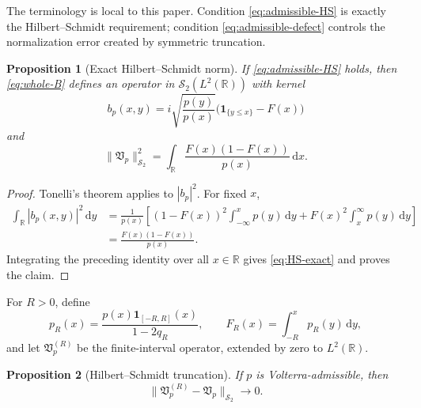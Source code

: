 \documentclass[11pt,reqno]{amsart}
\numberwithin{equation}{section}
\newtheorem{proposition}[proposition]{Proposition}
\newcommand{\R}{\mathbb R}
\newcommand{\1}{\mathbf 1}
\newcommand{\HS}{\mathcal S_2}
\newcommand{\Vp}{\mathfrak V_p}
\newcommand{\dd}{\,\mathrm d}
\begin{document}
The terminology is local to this paper.  Condition \eqref{eq:admissible-HS}
is exactly the Hilbert--Schmidt requirement; condition
\eqref{eq:admissible-defect} controls the normalization error created by
symmetric truncation.

\begin{proposition}[Exact Hilbert--Schmidt norm]\label{prop:HS-identity}
If \eqref{eq:admissible-HS} holds, then \eqref{eq:whole-B} defines an operator
in $\HS(L^2(\R))$ with kernel
\begin{equation}\label{eq:whole-kernel}
 b_p(x,y)=i\sqrt{\frac{p(y)}{p(x)}}
 \bigl(\1_{\{y\leq x\}}-F(x)\bigr)
\end{equation}
and
\begin{equation}\label{eq:HS-exact}
 \boxed{\|\Vp\|_{\HS}^2
 =\int_{\R}\frac{F(x)(1-F(x))}{p(x)}\dd x.}
\end{equation}
\end{proposition}

\begin{proof}
Tonelli's theorem applies to $|b_p|^2$.  For fixed $x$,
\begin{align*}
 \int_{\R}|b_p(x,y)|^2\dd y
 &=\frac{1}{p(x)}\left[(1-F(x))^2
 \int_{-\infty}^xp(y)\dd y
 +F(x)^2\int_x^\infty p(y)\dd y\right]\\
 &=\frac{F(x)(1-F(x))}{p(x)}.
\end{align*}
Integrating the preceding identity over all $x\in\R$ gives
\eqref{eq:HS-exact} and proves the claim.
\end{proof}

For $R>0$, define
\begin{equation}\label{eq:pR-def}
 p_R(x)=\frac{p(x)\1_{[-R,R]}(x)}{1-2q_R},
 \qquad
 F_R(x)=\int_{-R}^xp_R(y)\dd y,
\end{equation}
and let $\Vp^{(R)}$ be the finite-interval operator, extended by zero to
$L^2(\R)$.

\begin{proposition}[Hilbert--Schmidt truncation]\label{prop:HS-truncation}
If $p$ is Volterra-admissible, then
\begin{equation}\label{eq:HS-truncation}
 \|\Vp^{(R)}-\Vp\|_{\HS}\longrightarrow0.
\end{equation}
\end{proposition}
\end{document}
